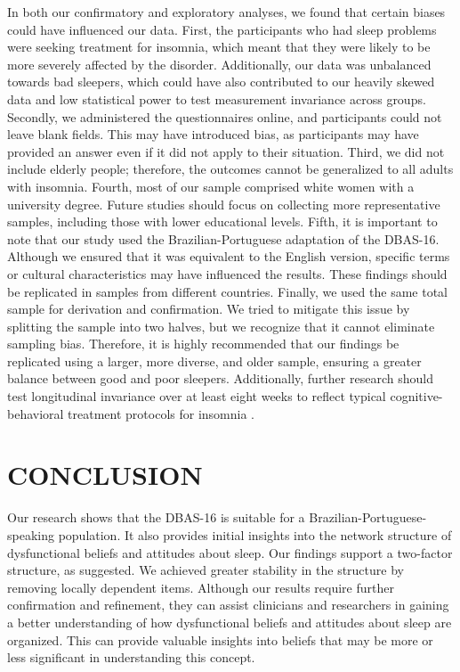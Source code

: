 \documentclass[
  12pt,
  twoside,
  openright,
  a4paper,
  chapter=TITLE,
  section=TITLE,
  brazil]{abntex2}
\begin{document}
In both our confirmatory and exploratory analyses, we found that certain
biases could have influenced our data. First, the participants who had
sleep problems were seeking treatment for insomnia, which meant that
they were likely to be more severely affected by the disorder.
Additionally, our data was unbalanced towards bad sleepers, which could
have also contributed to our heavily skewed data and low statistical
power to test measurement invariance across groups. Secondly, we
administered the questionnaires online, and participants could not leave
blank fields. This may have introduced bias, as participants may have
provided an answer even if it did not apply to their situation. Third,
we did not include elderly people; therefore, the outcomes cannot be
generalized to all adults with insomnia. Fourth, most of our sample
comprised white women with a university degree. Future studies should
focus on collecting more representative samples, including those with
lower educational levels. Fifth, it is important to note that our study
used the Brazilian-Portuguese adaptation of the DBAS-16. Although we
ensured that it was equivalent to the English version, specific terms or
cultural characteristics may have influenced the results. These findings
should be replicated in samples from different countries. Finally, we
used the same total sample for derivation and confirmation. We tried to
mitigate this issue by splitting the sample into two halves, but we
recognize that it cannot eliminate sampling bias. Therefore, it is
highly recommended that our findings be replicated using a larger, more
diverse, and older sample, ensuring a greater balance between good and
poor sleepers. Additionally, further research should test longitudinal
invariance over at least eight weeks to reflect typical
cognitive-behavioral treatment protocols for insomnia
\autocite{harvey2014}.

\hypertarget{conclusion}{%
\section{CONCLUSION}\label{conclusion}}

Our research shows that the DBAS-16 is suitable for a
Brazilian-Portuguese-speaking population. It also provides initial
insights into the network structure of dysfunctional beliefs and
attitudes about sleep. Our findings support a two-factor structure, as
\textcite{clemente2023} suggested. We achieved greater stability in the
structure by removing locally dependent items. Although our results
require further confirmation and refinement, they can assist clinicians
and researchers in gaining a better understanding of how dysfunctional
beliefs and attitudes about sleep are organized. This can provide
valuable insights into beliefs that may be more or less significant in
understanding this concept.


\printbibliography[title=REFERÊNCIAS]
\end{document}
